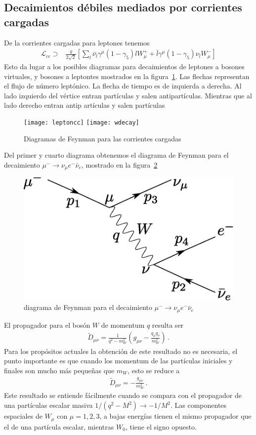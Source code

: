 \subsection{Decaimientos débiles mediados por corrientes cargadas}
De la corrientes cargadas para leptones tenemos
\begin{align}
  \mathcal{L}_{cc}\supset&\frac{g}{2\sqrt{2}}\left[\sum_l\bar{\nu_l}\gamma^\mu(1-\gamma_5)l W_\mu^++\bar{l}\gamma^\mu(1-\gamma_5)\nu_l W_\mu^-\right]
\end{align}
Esto da lugar a los posibles diagramas para decaimientos de leptones a bosones virtuales, y bosones a leptontes mostrados en la figura~\ref{fig:leptoncc}. Las flechas representan el flujo de número leptónico. La flecha de tiempo es de izquierda a derecha. Al lado izquierdo del vértice entran partículas y salen antipartículas. Mientras que al lado derecho entran antip artículas y salen partículas
\begin{figure}
  \centering
  \texttt{[image: leptoncc]}
\qquad  \texttt{[image: wdecay]}

  \caption{Diagramas de Feynman para las corrientes cargadas}
  \label{fig:leptoncc}
\end{figure}
Del primer y cuarto diagrama obtenemos el diagrama de Feynman para el decaimiento $\mu^-\to \nu_\mu e^-\bar{\nu}_e$, mostrado en la figura~\ref{fig:muondecay}
\begin{figure}
  \centering
  \includegraphics[scale=0.5]{muon_decay}
  \caption{diagrama de Feynman para el decaimiento $\mu^-\to \nu_\mu e^-\bar{\nu}_e$}
  \label{fig:muondecay}
\end{figure}
El propagador para el bosón $W$ de momentum $q$ resulta ser
\begin{align}
  \widetilde{D}_{\mu\nu}=\frac{1}{q^2-m_W^2}\left(g_{\mu\nu}-\frac{q_\mu q_\nu}{m_W^2}\right)\,.
\end{align}
Para los propósitos actuales la obtención de este resultado no es necesaria, el punto importante es que cuando los momentum de las partículas iniciales y finales son mucho más pequeñas que $m_W$, esto se reduce a
\begin{align}
  \widetilde{D}_{\mu\nu}=-\frac{g_{\mu\nu}}{m_W^2}\,.
\end{align}
Este resultado se entiende fácilmente cuando se compara con el propagador de una partículas escalar masiva $1/(q^2-M^2)\to-1/M^2$. Las componentes espaciales de $W_\mu$ con $\mu=1,2,3$, a bajas energías tienen el mismo propagador que el de una partícula escalar, mientras $W_0$, tiene el signo opuesto.

